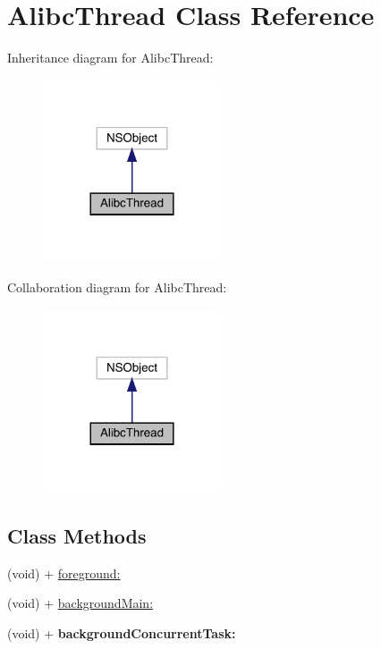 \hypertarget{interface_alibc_thread}{}\section{Alibc\+Thread Class Reference}
\label{interface_alibc_thread}


Inheritance diagram for Alibc\+Thread\+:\nopagebreak
\begin{figure}[H]
\begin{center}
\leavevmode
\includegraphics[width=149pt]{interface_alibc_thread__inherit__graph}
\end{center}
\end{figure}


Collaboration diagram for Alibc\+Thread\+:\nopagebreak
\begin{figure}[H]
\begin{center}
\leavevmode
\includegraphics[width=149pt]{interface_alibc_thread__coll__graph}
\end{center}
\end{figure}
\subsection*{Class Methods}
\begin{DoxyCompactItemize}
\item 
(void) + \mbox{\hyperlink{interface_alibc_thread_a6bdedce29f56318776821b9eaa2c3dc9}{foreground\+:}}
\item 
(void) + \mbox{\hyperlink{interface_alibc_thread_a31cdc4f99c101ead27c630f16f5d53ad}{background\+Main\+:}}
\item 
\mbox{\label{interface_alibc_thread_a4fdf877b59e9d0f68fd6c7ed14c35906}} 
(void) + {\bfseries background\+Concurrent\+Task\+:}
\end{DoxyCompactItemize}



